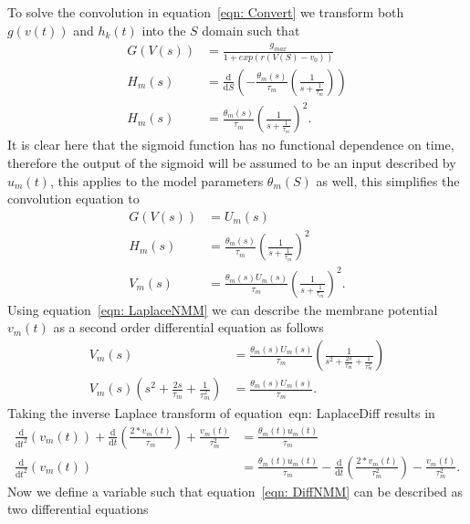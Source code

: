 To solve the convolution in equation~\ref{eqn: Convert} we transform both $g(v(t))$ and $h_{k}(t)$ into the $S$ domain such that \begin{align}%
\label{eqn: Laplace}
G(V(s)) &= \frac{g_{max}}{1+exp(r(V(S)-v_{0}))}\\
H_{m}(s) &= \frac{\mathrm{d}}{\mathrm{d}S}\left(-\frac{\theta_{m}(s)}{\tau_{m}}\left(\frac{1}{s+\frac{1}{\tau_{m}}}\right)\right)\\
H_{m}(s) &= \frac{\theta_{m}(s)}{\tau_{m}}\left(\frac{1}{s+\frac{1}{\tau_{m}}}\right)^2.
\end{align} It is clear here that the sigmoid function has no functional dependence on time, therefore the output of the sigmoid will be assumed to be an input described by $u_{m}(t)$, this applies to the model parameters $\theta_{m}(S)$ as well, this simplifies the convolution equation to \begin{align}%
G(V(s)) &= U_{m}(s)\\
H_{m}(s) &= \frac{\theta_{m}(s)}{\tau_{m}}\left(\frac{1}{s+\frac{1}{\tau_{m}}}\right)^2\\
\label{eqn: LaplaceNMM}
V_{m}(s) &= \frac{\theta_{m}(s)U_{m}(s)}{\tau_{m}}\left(\frac{1}{s+\frac{1}{\tau_{m}}}\right)^2.
\end{align} Using equation~\ref{eqn: LaplaceNMM} we can describe the membrane potential $v_{m}(t)$ as a second order differential equation as follows \begin{align}%
V_{m}(s) &= \frac{\theta_{m}(s)U_{m}(s)}{\tau_{m}}\left(\frac{1}{s^2+\frac{2s}{\tau_{m}}+\frac{1}{\tau^2_{m}}}\right)\\
\label{eqn: LaplaceDiff}
V_{m}(s)\left(s^2+\frac{2s}{\tau_{m}}+\frac{1}{\tau^2_{m}}\right) &= \frac{\theta_{m}(s)U_{m}(s)}{\tau_{m}}.
\end{align} Taking the inverse Laplace transform of equation~{eqn: LaplaceDiff} results in \begin{align} %
\frac{\mathrm{d}}{\mathrm{d}t^2}(v_{m}(t)) + \frac{\mathrm{d}}{\mathrm{d}t}\left(\frac{2*v_{m}(t)}{\tau_{m}}\right) + \frac{v_{m}(t)}{\tau^2_{m}} &= \frac{\theta_{m}(t)u_{m}(t)}{\tau_{m}}\\
\label{eqn: DiffNMM}
\frac{\mathrm{d}}{\mathrm{d}t^2}(v_{m}(t)) &= \frac{\theta_{m}(t)u_{m}(t)}{\tau_{m}} - \frac{\mathrm{d}}{\mathrm{d}t}\left(\frac{2*v_{m}(t)}{\tau^2_{m}}\right) -\frac{v_{m}(t)}{\tau^2_{m}}. \end{align} Now we define a variable such that equation~\ref{eqn: DiffNMM} can be described as two differential equations \begin{align} %

\end{align}
